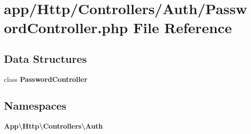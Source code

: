 \section{app/\+Http/\+Controllers/\+Auth/\+Password\+Controller.php File Reference}
\label{_password_controller_8php}
\subsection*{Data Structures}
\begin{DoxyCompactItemize}
\item 
class {\bf Password\+Controller}
\end{DoxyCompactItemize}
\subsection*{Namespaces}
\begin{DoxyCompactItemize}
\item 
 {\bf App\textbackslash{}\+Http\textbackslash{}\+Controllers\textbackslash{}\+Auth}
\end{DoxyCompactItemize}

